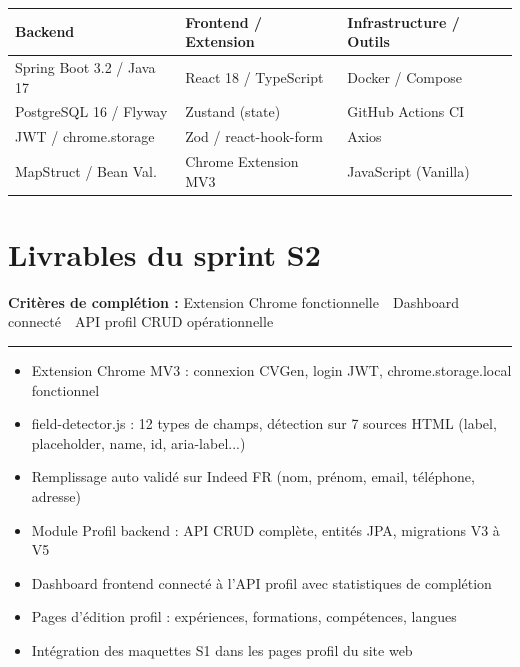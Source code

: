 \documentclass[11pt,a4paper]{article}
\newcommand{\THead}[1]{\cellcolor{navyblue}\leavevmode\color{white}\bfseries #1}
\begin{document}
{\setlength{\arrayrulewidth}{0.5pt}
\begin{tabularx}{\linewidth}{|X|X|X|}
\hline
\THead{Backend} & \THead{Frontend / Extension} & \THead{Infrastructure / Outils} \\
\hline
\rowcolor{rowalt} Spring Boot 3.2 / Java 17 & React 18 / TypeScript & Docker / Compose \\
\hline
PostgreSQL 16 / Flyway & Zustand (state) & GitHub Actions CI \\
\hline
\rowcolor{rowalt} JWT / chrome.storage & Zod / react-hook-form & Axios \\
\hline
MapStruct / Bean Val. & Chrome Extension MV3 & JavaScript (Vanilla) \\
\hline
\end{tabularx}}

\section{Livrables du sprint S2}

\begin{tcolorbox}[
  colback=livbg, colframe=livgreen,
  arc=3pt, left=8pt, right=8pt, top=6pt, bottom=6pt
]
\textcolor{livgreen}{\textbf{Crit\`eres de compl\'etion :} Extension Chrome fonctionnelle~\textbullet~Dashboard connect\'e~\textbullet~API profil CRUD op\'erationnelle}
\vspace{4pt}
{\color{livgreen!50!black}\rule{\linewidth}{0.5pt}}
\vspace{4pt}
\begin{itemize}[leftmargin=1.2em, itemsep=2pt, topsep=0pt, parsep=0pt]
  \item Extension Chrome MV3 : connexion CVGen, login JWT, chrome.storage.local fonctionnel
  \item field-detector.js : 12 types de champs, d\'etection sur 7 sources HTML (label, placeholder, name, id, aria-label...)
  \item Remplissage auto valid\'e sur Indeed FR (nom, pr\'enom, email, t\'el\'ephone, adresse)
  \item Module Profil backend : API CRUD compl\`ete, entit\'es JPA, migrations V3 \`a V5
  \item Dashboard frontend connect\'e \`a l'API profil avec statistiques de compl\'etion
  \item Pages d'\'edition profil : exp\'eriences, formations, comp\'etences, langues
  \item Int\'egration des maquettes S1 dans les pages profil du site web
\end{itemize}
\end{tcolorbox}
\end{document}

